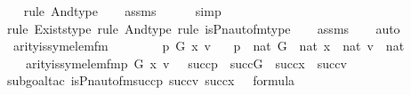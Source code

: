 \begin{isabellebody}
\ \ \isamarkupfalse%
{\isacharparenleft}{\kern0pt}rule\ And{\isacharunderscore}{\kern0pt}type{\isacharparenright}{\kern0pt}\isanewline
\ \ \isamarkupfalse%
\ assms\ \isanewline
\ \ \ \isamarkupfalse%
\ simp\isanewline
\ \ \isamarkupfalse%
{\isacharparenleft}{\kern0pt}rule\ Exists{\isacharunderscore}{\kern0pt}type{\isacharcomma}{\kern0pt}\ rule\ And{\isacharunderscore}{\kern0pt}type{\isacharcomma}{\kern0pt}\ rule\ is{\isacharunderscore}{\kern0pt}Pn{\isacharunderscore}{\kern0pt}auto{\isacharunderscore}{\kern0pt}fm{\isacharunderscore}{\kern0pt}type{\isacharparenright}{\kern0pt}\isanewline
\ \ \isamarkupfalse%
\ assms\isanewline
\ \ \isamarkupfalse%
\ auto%
\endisatagproof
{\isafoldproof}%
%
\isadelimproof
\isanewline
%
\endisadelimproof
\isanewline
{}\isamarkupfalse%
\ arity{\isacharunderscore}{\kern0pt}is{\isacharunderscore}{\kern0pt}sym{\isacharunderscore}{\kern0pt}elem{\isacharunderscore}{\kern0pt}fm\ {\isacharcolon}{\kern0pt}\ \ \ \ \isanewline
\ \ \ p\ G\ x\ v\isanewline
\ \ \ {\isachardoublequoteopen}p\ {\isasymin}\ nat{\isachardoublequoteclose}\ {\isachardoublequoteopen}G\ {\isasymin}\ nat{\isachardoublequoteclose}\ {\isachardoublequoteopen}x\ {\isasymin}\ nat{\isachardoublequoteclose}\ {\isachardoublequoteopen}v\ {\isasymin}\ nat{\isachardoublequoteclose}\ \isanewline
\ \ \ {\isachardoublequoteopen}arity{\isacharparenleft}{\kern0pt}is{\isacharunderscore}{\kern0pt}sym{\isacharunderscore}{\kern0pt}elem{\isacharunderscore}{\kern0pt}fm{\isacharparenleft}{\kern0pt}p{\isacharcomma}{\kern0pt}\ G{\isacharcomma}{\kern0pt}\ x{\isacharcomma}{\kern0pt}\ v{\isacharparenright}{\kern0pt}{\isacharparenright}{\kern0pt}\ {\isasymle}\ \ succ{\isacharparenleft}{\kern0pt}p{\isacharparenright}{\kern0pt}\ {\isasymunion}\ succ{\isacharparenleft}{\kern0pt}G{\isacharparenright}{\kern0pt}\ {\isasymunion}\ succ{\isacharparenleft}{\kern0pt}x{\isacharparenright}{\kern0pt}\ {\isasymunion}\ succ{\isacharparenleft}{\kern0pt}v{\isacharparenright}{\kern0pt}{\isachardoublequoteclose}\isanewline
%
\isadelimproof
\isanewline
\ \ %
\endisadelimproof
%
\isatagproof
{}\isamarkupfalse%
{\isacharparenleft}{\kern0pt}subgoal{\isacharunderscore}{\kern0pt}tac\ {\isachardoublequoteopen}is{\isacharunderscore}{\kern0pt}Pn{\isacharunderscore}{\kern0pt}auto{\isacharunderscore}{\kern0pt}fm{\isacharparenleft}{\kern0pt}succ{\isacharparenleft}{\kern0pt}p{\isacharparenright}{\kern0pt}{\isacharcomma}{\kern0pt}\ succ{\isacharparenleft}{\kern0pt}v{\isacharparenright}{\kern0pt}{\isacharcomma}{\kern0pt}\ succ{\isacharparenleft}{\kern0pt}x{\isacharparenright}{\kern0pt}{\isacharcomma}{\kern0pt}\ {}{\isacharparenright}{\kern0pt}\ {\isasymin}\ formula{\isachardoublequoteclose}{\isacharparenright}{\kern0pt}\isanewline

\end{isabellebody}
